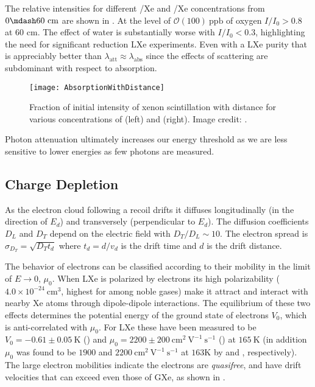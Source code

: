 The relative intensities for different /Xe and /Xe concentrations from $0 \mdash 60\ \mathrm{cm}$ are shown in
.  At the level of $\mathcal{O}(100)\ \mathrm{ppb}$ of
oxygen $I / I_0 > 0.8$ at 60 cm.  The effect of water is substantially worse with $I / I_0 < 0.3$, highlighting the need for
significant reduction LXe experiments.  Even with a LXe purity that is appreciably better than
 $\lambda_{\mathrm{att}} \approx \lambda_{\mathrm{abs}}$ since
the effects of scattering are subdominant with respect to absorption.

\begin{figure}
\centering
\texttt{[image: AbsorptionWithDistance]}
\caption{Fraction of initial intensity of xenon scintillation with distance for various concentrations of \htwoo (left) and \otwo
(right).  Image credit: .}
\label{fig:importance_procedure_effects_photons_absorption_distance}
\end{figure}

Photon attenuation ultimately increases our energy threshold as we are less sensitive to lower energies as few photons are
measured.



\subsection{Charge Depletion}
\label{subsubsec:importance_procedure_effects_charge}
As the electron cloud following a recoil drifts it diffuses
longitudinally (in the direction of $E_{d}$) and transversely (perpendicular to $E_{d}$).  The
diffusion coefficients $D_{L}$ and $D_{T}$ depend on the electric field with $D_{T}/D_{L} \sim 10$.  The electron spread is
$\sigma_{D_{T}} = \sqrt{D_{T} t_{d}}$ where $t_{d} = d/v_{d}$ is the drift time and $d$ is the drift distance.

The behavior of electrons can be classified according to their mobility in the limit of $E \rightarrow 0$, $\mu_0$.  When LXe is
polarized by electrons its high polarizability ($4.0 \times 10^{-24}\ \mathrm{cm^3}$, highest for among noble gases) make it
attract \electron and interact with nearby Xe atoms through dipole-dipole interactions.  The equilibrium of these two effects
determines the potential energy of the ground state of electrons $V_0$, which is anti-correlated with $\mu_0$.  For LXe these have
been measured to be $V_0 = -0.61 \pm 0.05\ \mathrm{K}$ () and $\mu_0 = 2200 \pm 200\ \mathrm{cm^2\ V^{-1}\ s^{-1}}$
() at $165\ \mathrm{K}$ (in addition $\mu_0$ was found to be $1900$ and $2200\ \mathrm{cm^2\ V^{-1}\ s^{-1}}$
at $163\mathrm{K}$ by  and , respectively).  The large electron mobilities indicate the
electrons are \textit{quasifree}, and have drift velocities that can exceed even those of GXe, as shown in
.

